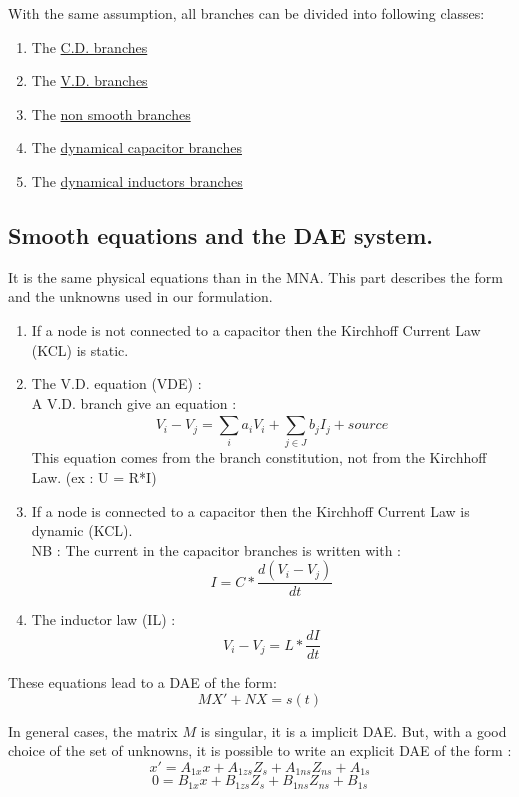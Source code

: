 With the same assumption, all branches can be divided into following classes:\\
\begin{enumerate}
\item The  \underline{C.D. branches} 
\item The  \underline{V.D. branches}
 \item The  \underline{non smooth branches}
 \item The \underline{dynamical capacitor branches}
 \item The \underline{dynamical inductors branches}
\end{enumerate}



\subsection{Smooth equations and the DAE system.}
It is the same physical equations than in the MNA. This part describes the form and the unknowns
used in our formulation.

\begin{enumerate} 
 \item If a node is not connected to a capacitor then the Kirchhoff Current Law (KCL) is static. \\
  \item The V.D. equation (VDE) : \\
    A V.D. branch give an equation :
    \[V_{i}-V_{j} = \sum_{i}^{}a_{i}V_{i} + \sum_{j\in J}^{}b_{j}I_{j} +   source\]
    This equation comes from the branch constitution, not from the Kirchhoff Law. (ex : U = R*I)
  \item If a node is connected to a capacitor then the Kirchhoff Current Law is dynamic (KCL).\\
    NB : The current in the capacitor branches is written with :
    \[I = C*\frac{d(V_{i} - V_{j})}{dt}\]
  \item The inductor law (IL) : 
     \[V_{i} - V_{j} = L*\frac{dI}{dt}\]
\end{enumerate}

These equations lead to a DAE of the form:
\[MX'+NX=s(t)\]

In general cases, the matrix $M$ is singular, it is a implicit DAE. But, with a good choice of the set of unknowns, it is
possible to write an explicit DAE of the form :
\[x' = A_{1x}x +A_{1zs}Z_{s} + A_{1ns}Z_{ns}+A_{1s}\]
\[0  = B_{1x}x+B_{1zs}Z_{s} + B_{1ns}Z_{ns}+B_{1s}\]

